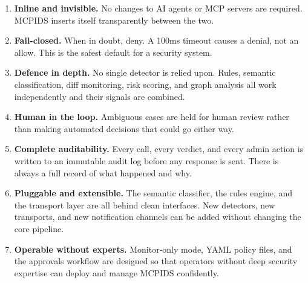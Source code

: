 \documentclass[12pt,a4paper]{report}
\begin{document}
\begin{enumerate}
  \item \textbf{Inline and invisible.} No changes to AI agents or MCP servers
    are required. MCPIDS inserts itself transparently between the two.

  \item \textbf{Fail-closed.} When in doubt, deny. A 100ms timeout causes a
    denial, not an allow. This is the safest default for a security system.

  \item \textbf{Defence in depth.} No single detector is relied upon. Rules,
    semantic classification, diff monitoring, risk scoring, and graph analysis
    all work independently and their signals are combined.

  \item \textbf{Human in the loop.} Ambiguous cases are held for human
    review rather than making automated decisions that could go either way.

  \item \textbf{Complete auditability.} Every call, every verdict, and every
    admin action is written to an immutable audit log before any response is
    sent. There is always a full record of what happened and why.

  \item \textbf{Pluggable and extensible.} The semantic classifier, the
    rules engine, and the transport layer are all behind clean interfaces.
    New detectors, new transports, and new notification channels can be added
    without changing the core pipeline.

  \item \textbf{Operable without experts.} Monitor-only mode, YAML policy
    files, and the approvals workflow are designed so that operators without
    deep security expertise can deploy and manage MCPIDS confidently.
\end{enumerate}

\vspace{1cm}
\end{document}
